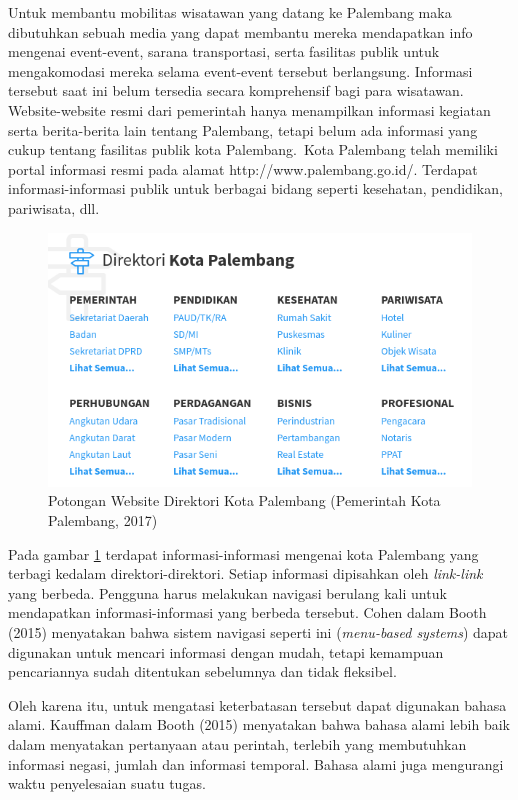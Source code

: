 Untuk membantu mobilitas wisatawan yang datang ke Palembang maka dibutuhkan sebuah media yang dapat membantu mereka mendapatkan info mengenai event-event, sarana transportasi, serta fasilitas publik untuk mengakomodasi mereka selama event-event tersebut berlangsung. Informasi tersebut saat ini belum tersedia secara komprehensif bagi para wisatawan. Website-website resmi dari pemerintah hanya menampilkan informasi kegiatan serta berita-berita lain tentang Palembang, tetapi belum ada informasi yang cukup tentang fasilitas publik kota Palembang.\ 
Kota Palembang telah memiliki portal informasi resmi pada alamat http://www.palembang.go.id/. Terdapat informasi-informasi publik untuk berbagai bidang seperti kesehatan, pendidikan, pariwisata, dll.\
\begin{figure}[H]
  \centering
    \includegraphics[scale=0.7]{gambar/palembanggoid}
    \caption{Potongan Website Direktori Kota Palembang (Pemerintah Kota Palembang, 2017)}
    \label{fig:plgportal}
\end{figure}
Pada gambar \ref{fig:plgportal} terdapat informasi-informasi mengenai kota Palembang yang terbagi kedalam direktori-direktori. Setiap informasi dipisahkan oleh \emph{link-link}  yang berbeda. Pengguna harus melakukan navigasi berulang kali untuk mendapatkan informasi-informasi yang berbeda tersebut. Cohen dalam Booth (2015) menyatakan bahwa sistem navigasi seperti ini (\emph{menu-based systems}) dapat digunakan untuk mencari informasi dengan mudah, tetapi kemampuan pencariannya sudah ditentukan sebelumnya dan tidak fleksibel.\

Oleh karena itu, untuk mengatasi keterbatasan tersebut dapat digunakan bahasa alami. Kauffman dalam Booth (2015) menyatakan bahwa bahasa alami lebih baik dalam menyatakan pertanyaan atau perintah, terlebih yang membutuhkan informasi negasi, jumlah dan informasi temporal. Bahasa alami juga mengurangi waktu penyelesaian suatu tugas.\

